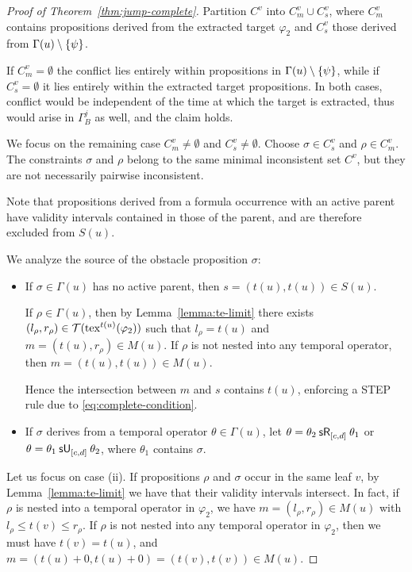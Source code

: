 \documentclass{easychair}
\begin{document}
\begin{proof}[Proof of Theorem~\ref{thm:jump-complete}]
    Partition $C^v$ into $C^v_m \cup C^v_s$, where $C^v_m$ contains propositions derived from the extracted target $\varphi_2$ and $C^v_s$ those derived from $\Gamma(u) \setminus \set{\psi}$. 

    If $C^v_m = \emptyset$ the conflict lies entirely within propositions in $\Gamma(u) \setminus \set{\psi}$, while if $C^v_s = \emptyset$ it lies entirely within the extracted target propositions. In both cases, conflict would be independent of the time at which the target is extracted, thus would arise in $\Gamma_B^j$ as well, and the claim holds.

    We focus on the remaining case $C^v_m \neq \emptyset$ and $C^v_s \neq \emptyset$. Choose $\sigma \in C^v_s$ and $\rho \in C^v_m$. The constraints $\sigma$ and $\rho$ belong to the same minimal inconsistent set $C^v$, but they are not necessarily pairwise inconsistent.

    Note that propositions derived from a formula occurrence with an active parent have validity intervals contained in those of the parent, and are therefore excluded from $S(u)$.
    
    We analyze the source of the obstacle proposition $\sigma$:
    \begin{itemize}
        \item[(i)]
        If $\sigma \in \Gamma(u)$ has no active parent, then $s = (t(u), t(u)) \in S(u)$.
        
        If $\rho \in \Gamma(u)$, then by Lemma~\ref{lemma:te-limit} there exists $(l_\rho, r_\rho) \in \tinv(\exp^{t(u)}(\varphi_2))$ such that $l_\rho = t(u)$ and $m = (t(u), r_\rho) \in M(u)$.
        If $\rho$ is not nested into any temporal operator, then $m = (t(u), t(u)) \in M(u)$.

        Hence the intersection between $m$ and $s$ contains $t(u)$, enforcing a \textsf{STEP} rule due to \eqref{eq:complete-condition}.

        \item[(ii)] If $\sigma$ derives from a temporal operator $\theta \in \Gamma(u)$, let $\theta = \srelease{[c,d]}{\theta_2}{\theta_1}$ or $\theta = \suntil{[c,d]}{\theta_1}{\theta_2}$, where $\theta_1$ contains $\sigma$.
    \end{itemize}

    Let us focus on case (ii).
    If propositions $\rho$ and $\sigma$ occur in the same leaf $v$, by Lemma~\ref{lemma:te-limit} we have that their validity intervals intersect.
    In fact, if $\rho$ is nested into a temporal operator in $\varphi_2$, we have $m = (l_\rho, r_\rho) \in M(u)$ with $l_\rho \leq t(v) \leq r_\rho$.
    If $\rho$ is not nested into any temporal operator in $\varphi_2$, then we must have $t(v) = t(u)$, and $m = (t(u)+0, t(u)+0) = (t(v), t(v)) \in M(u)$.
    

\end{proof}
\end{document}
